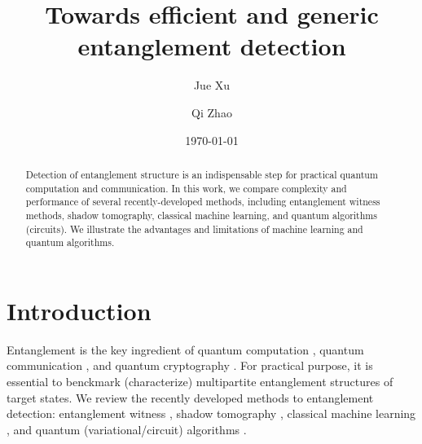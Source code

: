 \documentclass[
aps,
pra,
floatfix,
]{revtex4-2}
\theoremstyle{plain}
\theoremstyle{definition}
\begin{document}
\title{Towards efficient and generic entanglement detection}
\author{Jue Xu}
\author{Qi Zhao}
\date{\today}
\begin{abstract}
	Detection of entanglement structure is an indispensable step for practical quantum computation and communication.
	In this work, we compare complexity and performance of several recently-developed methods, including entanglement witness methods, shadow tomography, classical machine learning, and quantum algorithms (circuits).
	We illustrate the advantages and limitations of machine learning and quantum algorithms.
\end{abstract}

\maketitle
 \tableofcontents

\section{Introduction}
Entanglement \cite{horodeckiQuantumEntanglement2009} is the key ingredient of quantum computation \cite{}, quantum communication \cite{}, and quantum cryptography \cite{}.
For practical purpose, it is essential to benckmark (characterize) multipartite entanglement structures of target states.
We review the recently developed methods to entanglement detection: entanglement witness \cite{zhouDetectingMultipartiteEntanglement2019}, shadow tomography \cite{huangPredictingManyProperties2020}, classical machine learning \cite{huangPowerDataQuantum2021}, and quantum (variational/circuit) algorithms \cite{quekMultivariateTraceEstimation2022}.
\end{document}
